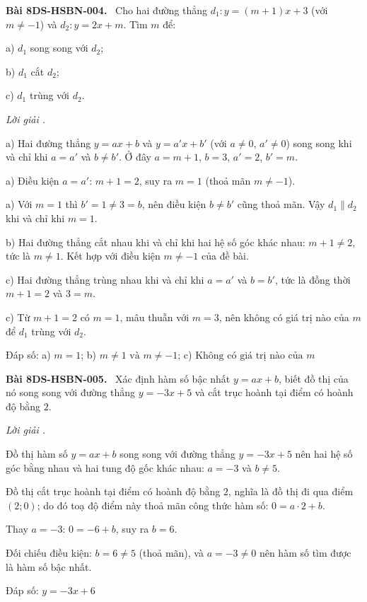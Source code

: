 \documentclass[12pt,a4paper]{article}
\newenvironment{problem}[1][]{\par\medskip\noindent\textbf{Bài #1.}\ }{\par}
\newenvironment{solution}[1][]{\par\noindent\textit{Lời giải #1.}\par}{\par}
\begin{document}
\begin{problem}[8DS-HSBN-004]
Cho hai đường thẳng $d_1: y = (m + 1)x + 3$ (với $m \neq -1$) và $d_2: y = 2x + m$. Tìm $m$ để:

a) $d_1$ song song với $d_2$;

b) $d_1$ cắt $d_2$;

c) $d_1$ trùng với $d_2$.

\begin{solution}
a) Hai đường thẳng $y = ax + b$ và $y = a'x + b'$ (với $a \neq 0$, $a' \neq 0$) song song khi và chỉ khi $a = a'$ và $b \neq b'$. Ở đây $a = m + 1$, $b = 3$, $a' = 2$, $b' = m$.

a) Điều kiện $a = a'$: $m + 1 = 2$, suy ra $m = 1$ (thoả mãn $m \neq -1$).

a) Với $m = 1$ thì $b' = 1 \neq 3 = b$, nên điều kiện $b \neq b'$ cũng thoả mãn. Vậy $d_1 \parallel d_2$ khi và chỉ khi $m = 1$.

b) Hai đường thẳng cắt nhau khi và chỉ khi hai hệ số góc khác nhau: $m + 1 \neq 2$, tức là $m \neq 1$. Kết hợp với điều kiện $m \neq -1$ của đề bài.

c) Hai đường thẳng trùng nhau khi và chỉ khi $a = a'$ và $b = b'$, tức là đồng thời $m + 1 = 2$ và $3 = m$.

c) Từ $m + 1 = 2$ có $m = 1$, mâu thuẫn với $m = 3$, nên không có giá trị nào của $m$ để $d_1$ trùng với $d_2$.

Đáp số: a) $\boxed{m = 1}$; b) $\boxed{m \neq 1 \text{ và } m \neq -1}$; c) $\boxed{\text{Không có giá trị nào của } m}$
\end{solution}
\end{problem}

\begin{problem}[8DS-HSBN-005]
Xác định hàm số bậc nhất $y = ax + b$, biết đồ thị của nó song song với đường thẳng $y = -3x + 5$ và cắt trục hoành tại điểm có hoành độ bằng $2$.

\begin{solution}
Đồ thị hàm số $y = ax + b$ song song với đường thẳng $y = -3x + 5$ nên hai hệ số góc bằng nhau và hai tung độ gốc khác nhau: $a = -3$ và $b \neq 5$.

Đồ thị cắt trục hoành tại điểm có hoành độ bằng $2$, nghĩa là đồ thị đi qua điểm $(2; 0)$; do đó toạ độ điểm này thoả mãn công thức hàm số: $0 = a \cdot 2 + b$.

Thay $a = -3$: $0 = -6 + b$, suy ra $b = 6$.

Đối chiếu điều kiện: $b = 6 \neq 5$ (thoả mãn), và $a = -3 \neq 0$ nên hàm số tìm được là hàm số bậc nhất.

Đáp số: $\boxed{y = -3x + 6}$
\end{solution}
\end{problem}
\end{document}
